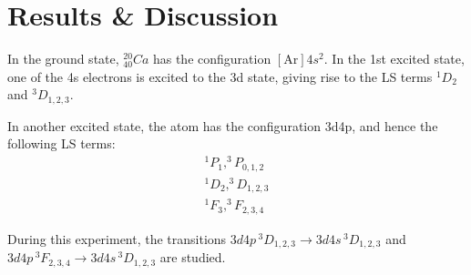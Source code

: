 \documentclass[a4paper]{article}
\begin{document}
\section{Results \& Discussion}
In the ground state, $^{20}_{40}Ca$ has the configuration
$[\mathrm{Ar}]4s^2$. In the 1st excited state, one of the 4s electrons is
excited to the 3d state, giving rise to the LS terms $^1D_2$ and
$^3D_{1,2,3}$.

In another excited state, the atom has the configuration 3d4p, and
hence the following LS terms:
\[
\begin{array}{c}
^1P_1, ^3P_{0, 1, 2}\\
^1D_2, ^3D_{1,2,3} \\
^1F_3, ^3F_{2,3,4}
\end{array}
\]

During this experiment, the transitions $3d4p\,^3D_{1,2,3} \to
3d4s\,^3D_{1,2,3}$ and $3d4p\,^3F_{2,3,4} \to 3d4s\,^3D_{1,2,3}$ are
studied.
\end{document}

